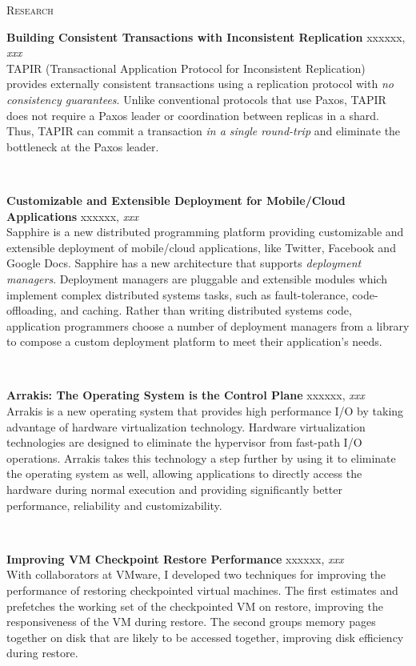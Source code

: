 \documentclass[10pt,times]{report}
\newlength{\sectiongap}
\newlength{\entrygap}
\newlength{\sectioncolwidth}
\newlength{\colgap}
\newlength{\stuffwidth}
\def\ifEqString#1#2{\def\testa{#1}\def\testb{#2}%
  \ifx\testa\testb}
\newenvironment{rtable}{
  \begin{minipage}{\textwidth}
  }{
  \end{minipage}
}
\newenvironment{rentry}[3][xxx]{
  \begin{minipage}[t]{\hsize}
    \textbf{#2}\ifEqString{#1}{xxx}\relax\else, \textit{#1}\fi
    \hspace{\stretch{1}} #3 \\
  }{
    \removelastskip
  \end{minipage}
  \\[\entrygap]  %
}
\newenvironment{rsection}[1]{
  \begin{minipage}[t]{\sectioncolwidth}
    \textsc{#1}
  \end{minipage}
  \hspace{\colgap}
  \begin{minipage}[t]{\stuffwidth}
  }{
    \removelastskip
  \end{minipage}
  \\[\sectiongap]
}
\begin{document}
\begin{rtable}
  \begin{rsection}{Research}
    \begin{rentry}{Building Consistent Transactions with Inconsistent
        Replication}{}
      TAPIR (Transactional Application Protocol for Inconsistent
      Replication) provides externally consistent transactions using a
      replication protocol with \emph{no consistency guarantees}.
      Unlike conventional protocols that use Paxos, TAPIR does not
      require a Paxos leader or coordination between replicas in a
      shard. Thus, TAPIR can commit a transaction \emph{in a single
        round-trip} and eliminate the bottleneck at the Paxos leader.
    \end{rentry}

    \begin{rentry}{Customizable and Extensible Deployment for
        Mobile/Cloud Applications}{}
      Sapphire is a new distributed programming platform providing
      customizable and extensible deployment of mobile/cloud
      applications, like Twitter, Facebook and Google Docs. Sapphire
      has a new architecture that supports \emph{deployment
        managers}. Deployment managers are pluggable and extensible
      modules which implement complex distributed systems tasks, such
      as fault-tolerance, code-offloading, and caching. Rather than
      writing distributed systems code, application programmers choose
      a number of deployment managers from a library to compose a
      custom deployment platform to meet their application's needs.
    \end{rentry}

    \begin{rentry}{Arrakis: The Operating System is the Control Plane}{}
      Arrakis is a new operating system that provides high performance
      I/O by taking advantage of hardware virtualization
      technology. Hardware virtualization technologies are designed to
      eliminate the hypervisor from fast-path I/O operations. Arrakis
      takes this technology a step further by using it to eliminate
      the operating system as well, allowing applications to directly
      access the hardware during normal execution and providing
      significantly better performance, reliability and
      customizability.
    \end{rentry}

    \begin{rentry}{Improving VM Checkpoint Restore Performance}{} 
      With collaborators at VMware, I developed two techniques for
      improving the performance of restoring checkpointed virtual
      machines. The first estimates and prefetches the working set of
      the checkpointed VM on restore, improving the responsiveness of
      the VM during restore. The second groups memory pages together
      on disk that are likely to be accessed together, improving disk
      efficiency during restore.
    \end{rentry}


\end{rsection}
\end{rtable}
\end{document}
